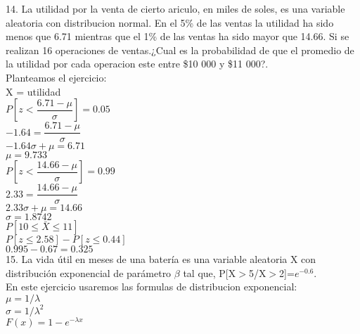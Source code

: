 \documentclass[12 pt,letterpaper]{article}
\begin{document}
\hspace{-0.7cm}14. La utilidad por la venta de cierto ariculo, en miles de soles, es una variable aleatoria con distribucion normal. En el 5\% de las ventas la utilidad ha sido menos que 6.71 mientras que el 1\% de las ventas ha sido mayor que 14.66. Si se realizan 16 operaciones de ventas.¿Cual es la probabilidad de que el promedio de la utilidad por cada operacion este entre \$10 000 y \$11 000?.\\[2ex]

\hspace{-0.7cm}Planteamos el ejercicio:\\[2ex]

\hspace{-0.7cm}X = utilidad\\[1ex]

\hspace{-0.7cm}$P[z < \dfrac{6.71 - \mu}{\sigma}] = 0.05$\\[1ex]
$-1.64 = \dfrac{6.71-\mu}{\sigma}$\\[1ex]
$-1.64\sigma + \mu = 6.71$\\[1ex]
$\mu = 9.733$\\[1ex]

\hspace{-0.7cm}$P[z < \dfrac{14.66 - \mu}{\sigma}] = 0.99$\\[1ex]
$2.33 = \dfrac{14.66-\mu}{\sigma}$\\[1ex]
$2.33\sigma + \mu = 14.66$\\[1ex]
$\sigma = 1.8742$\\[1ex]

\hspace{-0.7cm}$P[10 \leq  \bar{X} \leq 11]$\\[1ex]
$P[z \leq  2.58] - P[z \leq  0.44]$\\[1ex]
$0.995 - 0.67 = 0.325$\\[15ex]

\hspace{-0.7cm}15. La vida útil en meses de una batería es una variable aleatoria X con distribución exponencial de parámetro $\beta$ tal que, P[X$>$5/X$>$2]=$e^{-0.6}$.\\[2ex]

\hspace{-0.7cm}En este ejercicio usaremos las formulas de distribucion exponencial:\\[2ex]

\hspace{-0.7cm}$\mu = 1/ \lambda$\\[2ex]
$\sigma = 1/ \lambda^2$\\[2ex]
$F(x) = 1-e^{-\lambda x}$\\[2ex]
\end{document}
